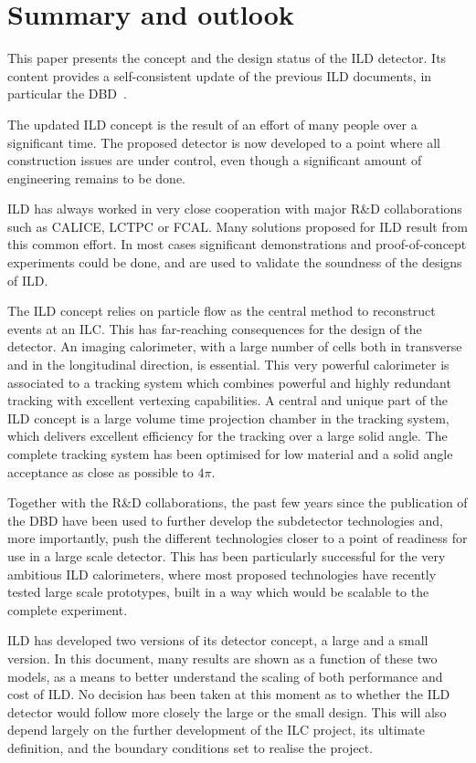 \chapter{Summary and outlook}
\label{chap:summary}

This paper presents the concept and the design status of the ILD detector. Its content provides a self-consistent update of the previous ILD documents, in particular the DBD~\cite{ild:bib:ilddbd}. 

The updated ILD concept is the result of an effort of many people over a significant time. The proposed detector is now developed to a point where all construction issues are under control, even though a significant amount of engineering remains to be done. 

ILD has always worked in very close cooperation with major R\&D collaborations such as CALICE, LCTPC or FCAL. Many solutions proposed for ILD result from this common effort. In most cases significant demonstrations and proof-of-concept experiments could be done, and are used to validate the soundness of the designs of ILD. 

The ILD concept relies on particle flow as the central method to reconstruct events at an ILC. This has far-reaching consequences for the design of the detector. An imaging calorimeter, with a large number of cells both in transverse and in the longitudinal direction, is essential. This very powerful calorimeter is associated to a tracking system which combines powerful and highly redundant tracking with excellent vertexing capabilities. A central and unique part of the ILD concept is a large volume time projection chamber in the tracking system, which delivers excellent efficiency for the tracking over a large solid angle. The complete tracking system has been optimised for low material and a solid angle acceptance as close as possible to $4 \pi$.

Together with the R\&D collaborations, the past few years since the publication of the DBD have been used to further develop the subdetector technologies and, more importantly, push the different technologies closer to a point of readiness for use in a large scale detector. This has been particularly successful for the very ambitious ILD calorimeters, where most proposed technologies have recently tested large scale prototypes, built in a way which would be scalable to the complete experiment. 

ILD has developed two versions of its detector concept, a large and a small version. In this document, many results are shown as a function of these two models, as a means to better understand the scaling of both performance and cost of ILD. No decision has been taken at this moment as to whether the ILD detector would follow more closely the large or the small design. This will also depend largely on the further development of the ILC project, its ultimate definition, and the boundary conditions set to realise the project. 


